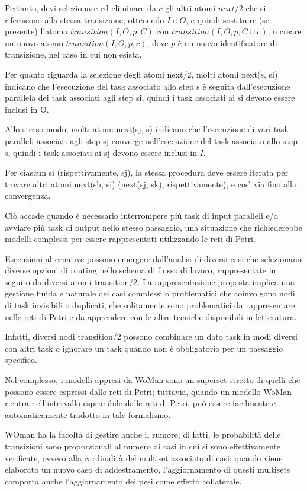 Pertanto, devi selezionare ed eliminare da $c$ gli altri atomi $next/2$ che si riferiscono alla stessa transizione, ottenendo $I$ e $O$, e quindi sostituire (se presente) l'atomo $transition(I, O, p, C)$ con $transition(I, O, p, C \cup {c})$, o creare un nuovo atomo $transition(I, O, p, {c})$, dove $p$ è un nuovo identificatore di transizione, nel caso in cui non esista.

Per quanto riguarda la selezione degli atomi next/2, molti atomi next(s, si) indicano che l'esecuzione del task associato allo step s è seguita dall'esecuzione parallela dei task associati agli step si, quindi i task associati ai si devono essere inclusi in O. 

Allo stesso modo, molti atomi next(sj, s) indicano che l'esecuzione di vari task paralleli associati agli step sj converge nell'esecuzione del task associato allo step s, quindi i task associati ai sj devono essere inclusi in $I$.

Per ciascun si (rispettivamente, sj), la stessa procedura deve essere iterata per trovare altri atomi next(sh, si) (next(sj, sk), rispettivamente), e così via fino alla convergenza. 

Ciò accade quando è necessario interrompere più task di input paralleli e/o avviare più task di output nello stesso passaggio, una situazione che richiederebbe modelli complessi per essere rappresentati utilizzando le reti di Petri.

Esecuzioni alternative possono emergere dall'analisi di diversi casi che selezionano diverse opzioni di routing nello schema di flusso di lavoro, rappresentate in seguito da diversi atomi transition/2. La rappresentazione proposta implica una gestione fluida e naturale dei casi complessi o problematici che coinvolgono nodi di task invisibili o duplicati, che solitamente sono problematici da rappresentare nelle reti di Petri e da apprendere con le altre tecniche disponibili in letteratura. 

Infatti, diversi nodi transition/2 possono combinare un dato task in modi diversi con altri task o ignorare un task quando non è obbligatorio per un passaggio specifico. 

Nel complesso, i modelli appresi da WoMan sono un superset stretto di quelli che possono essere espressi dalle reti di Petri; tuttavia, quando un modello WoMan rientra nell'intervallo esprimibile dalle reti di Petri, può essere facilmente e automaticamente tradotto in tale formalismo.

WOman ha la facoltà di gestire anche il rumore; di fatti, le probabilità delle transizioni sono proporzionali al numero di casi in cui si sono effettivamente verificate, ovvero alla cardinalità del multiset associato di casi: quando viene elaborato un nuovo caso di addestramento, l'aggiornamento di questi multisets comporta anche l'aggiornamento dei pesi come effetto collaterale. 

